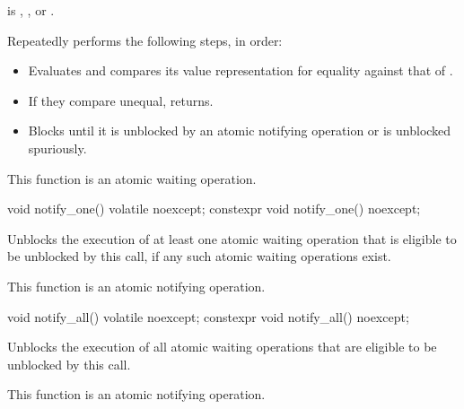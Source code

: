 \begin{itemdescr}
\pnum
\expects
{} is
,
, or
.

\pnum
\effects
Repeatedly performs the following steps, in order:
\begin{itemize}
\item
  Evaluates  and
  compares its value representation for equality against that of .
\item
  If they compare unequal, returns.
\item
  Blocks until it
  is unblocked by an atomic notifying operation or is unblocked spuriously.
\end{itemize}

\pnum
\remarks
This function is an atomic waiting operation.
\end{itemdescr}

%
%
%
%
\begin{itemdecl}
void notify_one() volatile noexcept;
constexpr void notify_one() noexcept;
\end{itemdecl}

\begin{itemdescr}
\pnum
\effects
Unblocks the execution of at least one atomic waiting operation
that is eligible to be unblocked by this call,
if any such atomic waiting operations exist.

\pnum
\remarks
This function is an atomic notifying operation.
\end{itemdescr}

%
%
%
%
\begin{itemdecl}
void notify_all() volatile noexcept;
constexpr void notify_all() noexcept;
\end{itemdecl}

\begin{itemdescr}
\pnum
\effects
Unblocks the execution of all atomic waiting operations
that are eligible to be unblocked by this call.

\pnum
\remarks
This function is an atomic notifying operation.
\end{itemdescr}

